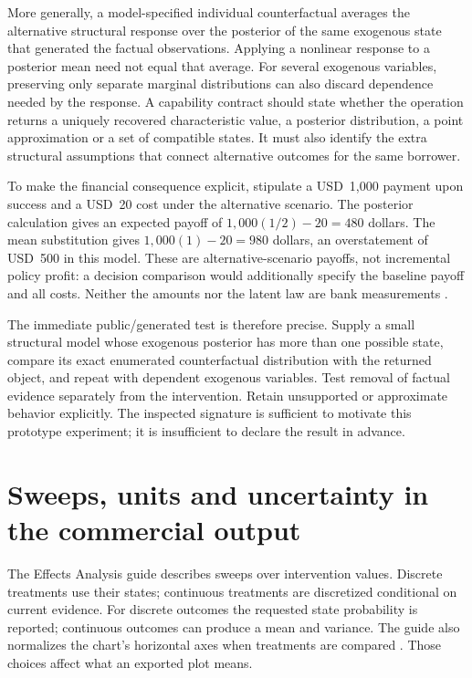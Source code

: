 More generally, a model-specified individual counterfactual averages the
alternative structural response over the posterior of the same exogenous
state that generated the factual observations. Applying a nonlinear response
to a posterior mean need not equal that average. For several exogenous
variables, preserving only separate marginal distributions can also discard
dependence needed by the response. A capability contract should state whether
the operation returns a uniquely recovered characteristic value, a posterior
distribution, a point approximation or a set of compatible states. It must
also identify the extra structural assumptions that connect alternative
outcomes for the same borrower.

To make the financial consequence explicit, stipulate a USD~1,000 payment
upon success and a USD~20 cost under the alternative scenario. The posterior
calculation gives an expected payoff of $1{,}000(1/2)-20=480$ dollars. The
mean substitution gives $1{,}000(1)-20=980$ dollars, an overstatement of
USD~500 in this model. These are alternative-scenario payoffs, not incremental
policy profit: a decision comparison would additionally specify the baseline
payoff and all costs. Neither the amounts nor the latent law are bank
measurements \citep{exec14_ci_exact}.

The immediate public/generated test is therefore precise. Supply a small
structural model whose exogenous posterior has more than one possible state,
compare its exact enumerated counterfactual distribution with the returned
object, and repeat with dependent exogenous variables. Test removal of factual
evidence separately from the intervention. Retain unsupported or approximate
behavior explicitly. The inspected signature is sufficient to motivate this
prototype experiment; it is insufficient to declare the result in advance.

\section{Sweeps, units and uncertainty in the commercial output}

The Effects Analysis guide describes sweeps over intervention values. Discrete
treatments use their states; continuous treatments are discretized conditional
on current evidence. For discrete outcomes the requested state probability is
reported; continuous outcomes can produce a mean and variance. The guide also
normalizes the chart's horizontal axes when treatments are compared
\citep{exec14_ci_effects}. Those choices affect what an exported plot means.

